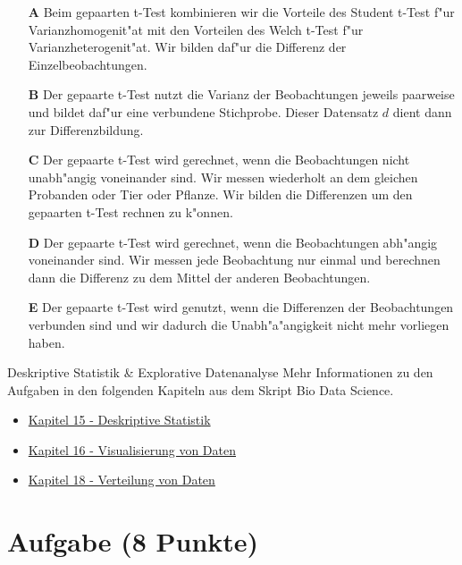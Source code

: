 \documentclass[a4paper, 9pt]{scrartcl}\usepackage[]{graphicx}\usepackage[]{xcolor}
\begin{document}
\begin{enumerate}
\item [\textbf{A} \msquare] Beim gepaarten t-Test kombinieren wir die Vorteile des Student t-Test f{"u}r Varianzhomogenit{"a}t mit den Vorteilen des Welch t-Test f{"u}r Varianzheterogenit{"a}t. Wir bilden daf{"u}r die Differenz der Einzelbeobachtungen.
\item [\textbf{B} \msquare] Der gepaarte t-Test nutzt die Varianz der Beobachtungen jeweils paarweise und bildet daf{"u}r eine verbundene Stichprobe. Dieser Datensatz $d$ dient dann zur Differenzbildung.
\item [\textbf{C} \msquare] Der gepaarte t-Test wird gerechnet, wenn die Beobachtungen nicht unabh{"a}ngig voneinander sind. Wir messen wiederholt an dem gleichen Probanden oder Tier oder Pflanze. Wir bilden die Differenzen um den gepaarten t-Test rechnen zu k{"o}nnen.
\item [\textbf{D} \msquare] Der gepaarte t-Test wird gerechnet, wenn die Beobachtungen abh{"a}ngig voneinander sind. Wir messen jede Beobachtung nur einmal und berechnen dann die Differenz zu dem Mittel der anderen Beobachtungen.
\item [\textbf{E} \msquare] Der gepaarte t-Test wird genutzt, wenn die Differenzen der Beobachtungen verbunden sind und wir dadurch die Unabh{"a}{"a}ngigkeit nicht mehr vorliegen haben.
\end{enumerate}
\clearpage
\begin{graybox}{Deskriptive Statistik \& Explorative Datenanalyse}
Mehr Informationen zu den Aufgaben in den folgenden Kapiteln aus dem Skript Bio Data Science.
  \begin{itemize}
  \item \href{https://jkruppa.github.io/eda-descriptive.html}{Kapitel 15 - Deskriptive Statistik}
  \item \href{https://jkruppa.github.io/eda-ggplot.html}{Kapitel 16 - Visualisierung von Daten}
  \item \href{https://jkruppa.github.io/eda-distribution.html}{Kapitel 18 - Verteilung von Daten}
  \end{itemize}
\end{graybox}
\clearpage

\section{Aufgabe \hfill (8 Punkte)}
\end{document}
